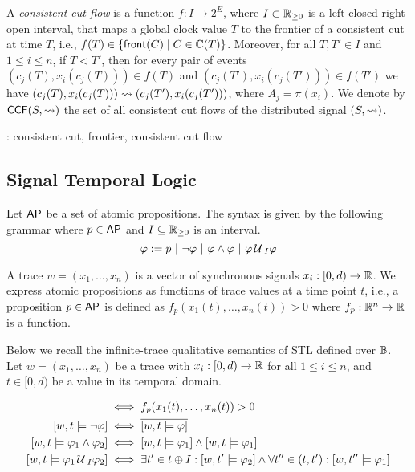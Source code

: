 A \emph{consistent cut flow} is a function $f : I \to 2^E$, where $I \subset \mathbb{R}_{\geq 0}$ is a left-closed right-open interval, that maps a global clock value $T$ to the frontier of a consistent cut at time $T$, i.e., $f(T) \in \{\fr(C) \st C \in \CC(T)\}$.
Moreover, for all $T,T' \in I$ and $1 \leq i \leq n$, if $T < T'$, then for every pair of events $(c_j(T), x_i(c_j(T))) \in f(T)$ and $(c_j(T'), x_i(c_j(T'))) \in f(T')$ we have $(c_j(T), x_i(c_j(T))) \rightsquigarrow (c_j(T'), x_i(c_j(T')))$, where $A_j = \pi(x_i)$.
We denote by $\mathsf{CCF}(S,{\rightsquigarrow})$ the set of all consistent cut flows of the distributed signal $(S,{\rightsquigarrow})$.

\begin{example}
	\TODO: consistent cut, frontier, consistent cut flow
\end{example}


\subsection{Signal Temporal Logic} \label{sec:stl}
Let $\mathsf{AP}$ be a set of atomic propositions.
The syntax is given by the following grammar where $p \in \mathsf{AP}$ and $I \subseteq \mathbb{R}_{\geq 0}$ is an interval.
$$ \varphi :=  p ~|~ \lnot \varphi ~|~ \varphi \land \varphi ~|~ \varphi \,\mathcal{U}\,_I \varphi $$

A trace $w = (x_1, \ldots, x_n)$ is a vector of synchronous signals $x_i : [0,d) \to \mathbb{R}$.
We express atomic propositions as functions of trace values at a time point $t$, i.e., a proposition $p \in \mathsf{AP}$ is defined as $f_p(x_1(t), \ldots, x_n(t)) > 0$ where $f_p : \mathbb{R}^n \to \mathbb{R}$ is a function.

Below we recall the infinite-trace qualitative semantics of STL defined over $\mathbb{B}$.
Let $w = (x_1, \ldots, x_n)$ be a trace with $x_i : [0,d) \to \mathbb{R}$ for all $1 \leq i \leq n$, and $t \in [0,d)$ be a value in its temporal domain.

\begin{align*}
	[w,t \models p] &\iff f_p(x_1(t), \ldots, x_n(t)) > 0 \\
	[w,t \models \lnot \varphi] &\iff \overline{[w,t \models \varphi]} \\
	[w,t \models \varphi_1 \land \varphi_2] &\iff [w,t \models \varphi_1] \land [w,t \models \varphi_1] \\
	[w,t \models \varphi_1 \until_I \varphi_2] &\iff \exists t' \in t \oplus I : [w,t' \models \varphi_2] \land \forall t'' \in (t, t') : [w,t'' \models \varphi_1] \\
\end{align*}

